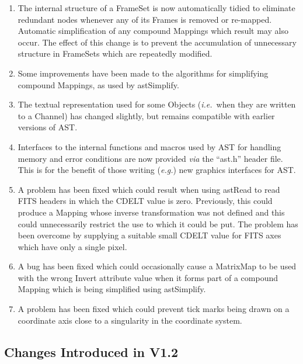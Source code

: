 \documentclass[twoside,11pt]{article}
\newcommand{\htmlref}[2]{#1}
\newcommand{\xlabel}[1]{}
\begin{document}
\begin{enumerate}
\item The internal structure of a FrameSet is now automatically tidied
to eliminate redundant nodes whenever any of its Frames is removed or
re-mapped. Automatic simplification of any compound Mappings which
result may also occur. The effect of this change is to prevent the
accumulation of unnecessary structure in FrameSets which are
repeatedly modified.

\item Some improvements have been made to the algorithms for
simplifying compound Mappings, as used by \htmlref{astSimplify}{astSimplify}.

\item The textual representation used for some Objects
({\em{i.e.}}\ when they are written to a \htmlref{Channel}{Channel}) has changed
slightly, but remains compatible with earlier versions of AST.

\item Interfaces to the internal functions and macros used by AST for
handling memory and error conditions are now provided {\em{via}} the
``ast.h'' header file. This is for the benefit of those writing
({\em{e.g.}}) new graphics interfaces for AST.

\item A problem has been fixed which could result when using \htmlref{astRead}{astRead}
to read FITS headers in which the CDELT value is zero. Previously,
this could produce a Mapping whose inverse transformation was not
defined and this could unnecessarily restrict the use to which it
could be put. The problem has been overcome by supplying a suitable
small CDELT value for FITS axes which have only a single pixel.

\item A bug has been fixed which could occasionally cause a \htmlref{MatrixMap}{MatrixMap}
to be used with the wrong \htmlref{Invert}{Invert} attribute value when it forms part of
a compound Mapping which is being simplified using astSimplify.


\item A problem has been fixed which could prevent tick marks being
drawn on a coordinate axis close to a singularity in the coordinate
system.
\end{enumerate}

\subsection{\xlabel{changes}\xlabel{list_of_most_recent_changes}Changes Introduced in V1.2}
\end{document}
